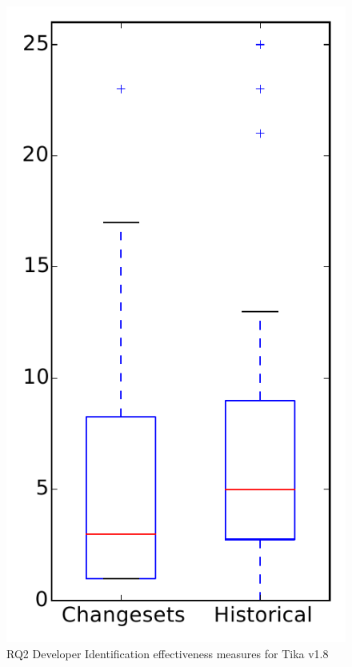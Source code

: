 
\begin{figure}
\centering
\includegraphics[height=0.4\textheight]{figures/dit/rq2_tika}
\caption{RQ2 Developer Identification effectiveness measures for Tika v1.8}
\label{fig:dit:rq2:tika}
\end{figure}
